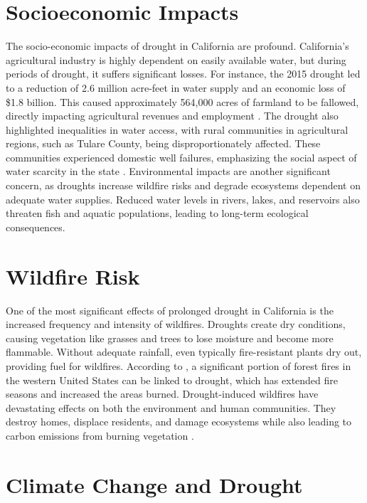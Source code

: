 \documentclass[
]{book}
\theoremstyle{definition}
\theoremstyle{definition}
\theoremstyle{definition}
\theoremstyle{definition}
\theoremstyle{remark}
\begin{document}
\section{Socioeconomic Impacts}\label{socioeconomic-impacts}

The socio-economic impacts of drought in California are profound. California's agricultural industry is highly dependent on easily available water, but during periods of drought, it suffers significant losses. For instance, the 2015 drought led to a reduction of 2.6 million acre-feet in water supply and an economic loss of \$1.8 billion. This caused approximately 564,000 acres of farmland to be fallowed, directly impacting agricultural revenues and employment \citep{sumner2015}. The drought also highlighted inequalities in water access, with rural communities in agricultural regions, such as Tulare County, being disproportionately affected. These communities experienced domestic well failures, emphasizing the social aspect of water scarcity in the state \citep{pompeii2020}. Environmental impacts are another significant concern, as droughts increase wildfire risks and degrade ecosystems dependent on adequate water supplies. Reduced water levels in rivers, lakes, and reservoirs also threaten fish and aquatic populations, leading to long-term ecological consequences.

\section{Wildfire Risk}\label{wildfire-risk}

One of the most significant effects of prolonged drought in California is the increased frequency and intensity of wildfires. Droughts create dry conditions, causing vegetation like grasses and trees to lose moisture and become more flammable. Without adequate rainfall, even typically fire-resistant plants dry out, providing fuel for wildfires. According to \citet{westerling2019}, a significant portion of forest fires in the western United States can be linked to drought, which has extended fire seasons and increased the areas burned. Drought-induced wildfires have devastating effects on both the environment and human communities. They destroy homes, displace residents, and damage ecosystems while also leading to carbon emissions from burning vegetation \citep{abatzoglou2016}.

\section{Climate Change and Drought}\label{climate-change-and-drought}
\end{document}
